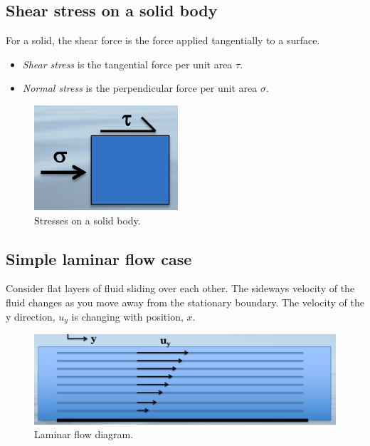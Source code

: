 \documentclass[class=report, crop=false, 12pt,a4paper]{standalone}
\numberwithin{equation}{section}
\begin{document}
\subsection{Shear stress on a solid body}
For a solid, the shear force is the force applied tangentially to a surface.
\begin{itemize}
  \item \emph{Shear stress} is the tangential force per unit area \( \tau\).
  \item \emph{Normal stress} is the perpendicular force per unit area \( \sigma \).
\end{itemize}
\begin{figure}[h!]
  \centering
  \includegraphics[width = 0.4 \textwidth]{../img/ShearForceDiagram}
  \caption{Stresses on a solid body.}
\end{figure}
\subsection{Simple laminar flow case}
Consider flat layers of fluid sliding over each other. The sideways velocity of the fluid changes as you move away from the stationary boundary. The velocity of the y direction, \( u_y \) is changing with position, \( x\). 
\begin{figure}[h!]
  \centering
  \includegraphics[width = 1 \textwidth]{../img/LaminarFlowSimple}
  \caption{Laminar flow diagram.}
\end{figure}
\end{document}
